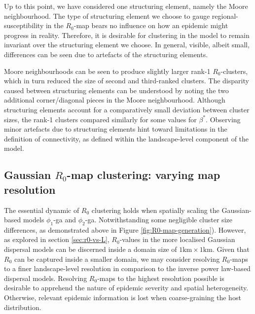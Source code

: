Up to this point, we have considered one structuring element, namely the Moore neighbourhood.
The type of structuring element we choose to gauge regional-susceptibility in the $R_0$-map bears no influence on how an epidemic might progress in reality.
Therefore, it is desirable for clustering in the model to remain invariant over the structuring element we choose.
In general, visible, albeit small, differences can be seen due to artefacts of the structuring elements.

Moore neighbourhoods can be seen to produce slightly larger rank-1 $R_0$-clusters, which in turn reduced the size of second and third-ranked clusters.
The disparity caused between structuring elements can be understood by noting the two additional corner/diagonal pieces in the Moore neighbourhood.
Although structuring elements account for a comparatively small deviation between cluster sizes, the rank-1 clusters compared similarly for some values for $\beta^*$.
Observing minor artefacts due to structuring elements hint toward limitations in the definition of connectivity, as defined within the landscape-level component of the model.

\subsection{Gaussian $R_0$-map clustering: varying map resolution}
\label{sec:gaussian-r0-clustering}

The essential dynamic of $R_0$ clustering holds when spatially scaling the Gaussian-based models $\phi_1$-ga and $\phi_2$-ga.
Notwithstanding some negligible cluster size differences, as demonstrated above in Figure \ref{fig:R0-map-generation}).
However, as explored in section \ref{sec:r0-vs-L}, $R_0$-values in the more localised Gaussian dispersal models can be discerned inside a domain size of $\mathrm{1km \times 1km}$.
Given that $R_0$ can be captured inside a smaller domain, we may consider resolving $R_0$-maps to a finer landscape-level resolution in comparison to the inverse power law-based dispersal models.
Resolving $R_0$-maps to the highest resolution possible is desirable to apprehend the nature of epidemic severity and spatial heterogeneity.
Otherwise, relevant epidemic information is lost when coarse-graining the host distribution. 

